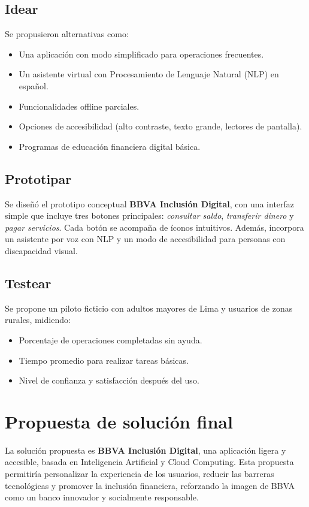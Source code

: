 \documentclass[12pt]{article}
\begin{document}
\subsection*{Idear}
\noindent Se propusieron alternativas como:
\begin{itemize}
  \item Una aplicación con modo simplificado para operaciones frecuentes.
  \item Un asistente virtual con Procesamiento de Lenguaje Natural (NLP) en español.
  \item Funcionalidades offline parciales.
  \item Opciones de accesibilidad (alto contraste, texto grande, lectores de pantalla).
  \item Programas de educación financiera digital básica.
\end{itemize}

\subsection*{Prototipar}
\noindent Se diseñó el prototipo conceptual \textbf{BBVA Inclusión Digital}, con una interfaz simple que incluye tres botones principales: \emph{consultar saldo}, \emph{transferir dinero} y \emph{pagar servicios}. Cada botón se acompaña de íconos intuitivos.  
Además, incorpora un asistente por voz con NLP y un modo de accesibilidad para personas con discapacidad visual.

\subsection*{Testear}
\noindent Se propone un piloto ficticio con adultos mayores de Lima y usuarios de zonas rurales, midiendo:
\begin{itemize}
  \item Porcentaje de operaciones completadas sin ayuda.
  \item Tiempo promedio para realizar tareas básicas.
  \item Nivel de confianza y satisfacción después del uso.
\end{itemize}

\section*{Propuesta de solución final}
\noindent La solución propuesta es \textbf{BBVA Inclusión Digital}, una aplicación ligera y accesible, basada en Inteligencia Artificial y Cloud Computing. Esta propuesta permitiría personalizar la experiencia de los usuarios, reducir las barreras tecnológicas y promover la inclusión financiera, reforzando la imagen de BBVA como un banco innovador y socialmente responsable.
\end{document}
